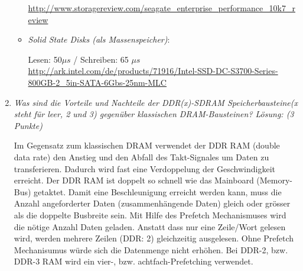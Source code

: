 \documentclass[10pt]{article}
\begin{document}
\begin{enumerate}[label=\alph*)]
\begin{itemize}
			\url{http://www.storagereview.com/seagate_enterprise_performance_10k7_review}
			
			
			\item \textit{Solid State Disks (als Massenspeicher)}:
			
			Lesen: 50$\mu s$ / Schreiben: 65 $\mu s$ \\
			
			\url{http://ark.intel.com/de/products/71916/Intel-SSD-DC-S3700-Series-800GB-2_5in-SATA-6Gbs-25nm-MLC}
		\end{itemize}
		\item 
			\textit{Was sind die Vorteile und Nachteile der DDR(x)-SDRAM Speicherbausteine(x steht für leer, 2 und 3) gegenüber klassischen DRAM-Bausteinen? Lösung: (3 Punkte)}
		
		Im Gegensatz zum klassischen DRAM verwendet der DDR RAM (double data rate) den Anstieg und den Abfall des Takt-Signales um Daten zu transferieren. Dadurch wird fast eine Verdoppelung der Geschwindigkeit erreicht. Der DDR RAM ist doppelt so schnell wie das Mainboard (Memory-Bus) getaktet. Damit eine Beschleunigung erreicht werden kann, muss die Anzahl angeforderter Daten (zusammenhängende Daten) gleich oder grösser als die doppelte Busbreite sein. 
		Mit Hilfe des Prefetch Mechanismuses wird die nötige Anzahl Daten geladen. Anstatt dass nur eine Zeile/Wort gelesen wird, werden mehrere Zeilen (DDR: 2) gleichzeitig ausgelesen. Ohne Prefetch Mechanisumus würde sich die Datenmenge nicht erhöhen. Bei DDR-2, bzw. DDR-3 RAM wird ein vier-, bzw. achtfach-Prefetching verwendet. 

		
\end{enumerate}
\end{document}
